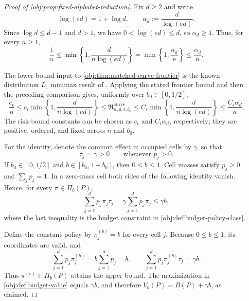 \begin{proof}[Proof of \cref{obj:prop:fixed-alphabet-reduction}]
Fix \(d\ge2\) and write
\[
\log(ed)=1+\log d,\qquad
\alpha_d:=\frac{d}{\log(ed)}.
\]
Since \(\log d\le d-1\) and \(d>1\), we have \(0<\log(ed)\le d\), so \(\alpha_d\ge1\). Thus, for every \(n\ge1\),
\[
\frac1n
\le \min\left\{1,\frac{d}{n\log(ed)}\right\}
=\min\left\{1,\frac{\alpha_d}{n}\right\}
\le\frac{\alpha_d}{n}.
\]

The lower-bound input to \cref{obj:thm:matched-curve-frontier} is the known-distribution \(L_1\) minimax result of \citep[Theorem 3 and the unknown-both-distributions reduction following Theorem 6]{JiaoHanWeissman2018}. Applying the stated frontier bound and then the preceding comparison gives, uniformly over \(b_0\in[0,1/2]\),
\[
\frac{c_\epsilon}{n}
\le c_\epsilon\min\left\{1,\frac{d}{n\log(ed)}\right\}
\le \mathfrak R_{n,d,\epsilon,b_0}^{\mathrm{curve}}
\le C_\epsilon\min\left\{1,\frac{d}{n\log(ed)}\right\}
\le\frac{C_\epsilon\alpha_d}{n}.
\]
The risk-bound constants can be chosen as \(c_\epsilon\) and \(C_\epsilon\alpha_d\), respectively; they are positive, ordered, and fixed across \(n\) and \(b_0\).

For the identity, denote the common effect in occupied cells by \(\gamma\), so that
\[
\tau_j=\gamma>0\qquad\text{whenever }p_j>0.
\]
If \(b_0\in[0,1/2]\) and \(b\in[b_0,1-b_0]\), then \(0\le b\le1\). Cell masses satisfy \(p_j\ge0\) and \(\sum_jp_j=1\). In a zero-mass cell both sides of the following identity vanish. Hence, for every \(\pi\in\Pi_b(P)\),
\[
\sum_{j=1}^d p_j\pi_j\tau_j
=\gamma\sum_{j=1}^d p_j\pi_j
\le \gamma b,
\]
where the last inequality is the budget constraint in \cref{obj:def:budget-policy-class}.

Define the constant policy by \(\pi^{(b)}_j=b\) for every cell \(j\). Because \(0\le b\le1\), its coordinates are valid, and
\[
\sum_{j=1}^d p_j\pi^{(b)}_j
=b\sum_{j=1}^d p_j=b,
\qquad
\sum_{j=1}^d p_j\pi^{(b)}_j\tau_j
=\gamma b.
\]
Thus \(\pi^{(b)}\in\Pi_b(P)\) attains the upper bound. The maximization in \cref{obj:def:budget-value} equals \(\gamma b\), and therefore \(V_b(P)=B(P)+\gamma b\), as claimed.
\end{proof}

